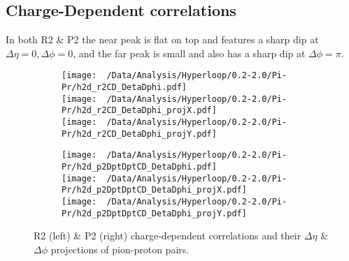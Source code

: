 \documentclass[12pt,a4paper,twoside]{report}
\begin{document}
\subsection{Charge-Dependent correlations}
In both R2 \& P2 the near peak is flat on top and features a sharp dip at $\Delta\eta=0,\Delta\phi=0$, and the far peak is small and also has a sharp dip at $\Delta\phi=\pi$.
\begin{figure}[H]
	\begin{subfigure}{0.49\linewidth}
		\texttt{[image: ~/Data/Analysis/Hyperloop/0.2-2.0/Pi-Pr/h2d\_r2CD\_DetaDphi.pdf]}\\
		\texttt{[image: ~/Data/Analysis/Hyperloop/0.2-2.0/Pi-Pr/h2d\_r2CD\_DetaDphi\_projX.pdf]}\\
		\texttt{[image: ~/Data/Analysis/Hyperloop/0.2-2.0/Pi-Pr/h2d\_r2CD\_DetaDphi\_projY.pdf]}\\
	\end{subfigure}
	\begin{subfigure}{0.49\linewidth}
		\texttt{[image: ~/Data/Analysis/Hyperloop/0.2-2.0/Pi-Pr/h2d\_p2DptDptCD\_DetaDphi.pdf]}\\
		\texttt{[image: ~/Data/Analysis/Hyperloop/0.2-2.0/Pi-Pr/h2d\_p2DptDptCD\_DetaDphi\_projX.pdf]}\\
		\texttt{[image: ~/Data/Analysis/Hyperloop/0.2-2.0/Pi-Pr/h2d\_p2DptDptCD\_DetaDphi\_projY.pdf]}\\
	\end{subfigure}
	\caption{R2 (left) \& P2 (right) charge-dependent correlations and their $\Delta\eta$ \& $\Delta\phi$ projections of pion-proton pairs.}
\end{figure}
\end{document}

